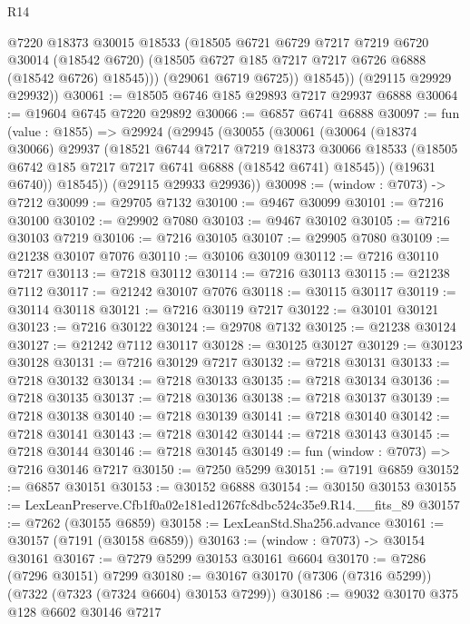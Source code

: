\begin{lexlean}{R14}
\begin{coremodule}
              @7220
              @18373
              @30015
              @18533
              (@18505
                @6721
                @6729
                @7217
                @7219
                @6720
                @30014
                (@18542 @6720)
                (@18505 @6727 @185 @7217 @7217 @6726 @6888 (@18542 @6726) @18545)))
            (@29061 @6719 @6725))
          @18545))
      (@29115 @29929 @29932))
@30061 := @18505 @6746 @185 @29893 @7217 @29937 @6888
@30064 := @19604 @6745 @7220 @29892
@30066 := @6857 @6741 @6888
@30097 := fun (value : @1855) =>
  @29924
    (@29945
      (@30055
        (@30061
          (@30064
            (@18374 @30066)
            @29937
            (@18521
              @6744
              @7217
              @7219
              @18373
              @30066
              @18533
              (@18505 @6742 @185 @7217 @7217 @6741 @6888 (@18542 @6741) @18545))
            (@19631 @6740))
          @18545))
      (@29115 @29933 @29936))
@30098 := (window : @7073) -> @7212
@30099 := @29705 @7132
@30100 := @9467 @30099
@30101 := @7216 @30100
@30102 := @29902 @7080
@30103 := @9467 @30102
@30105 := @7216 @30103 @7219
@30106 := @7216 @30105
@30107 := @29905 @7080
@30109 := @21238 @30107 @7076
@30110 := @30106 @30109
@30112 := @7216 @30110 @7217
@30113 := @7218 @30112
@30114 := @7216 @30113
@30115 := @21238 @7112
@30117 := @21242 @30107 @7076
@30118 := @30115 @30117
@30119 := @30114 @30118
@30121 := @7216 @30119 @7217
@30122 := @30101 @30121
@30123 := @7216 @30122
@30124 := @29708 @7132
@30125 := @21238 @30124
@30127 := @21242 @7112 @30117
@30128 := @30125 @30127
@30129 := @30123 @30128
@30131 := @7216 @30129 @7217
@30132 := @7218 @30131
@30133 := @7218 @30132
@30134 := @7218 @30133
@30135 := @7218 @30134
@30136 := @7218 @30135
@30137 := @7218 @30136
@30138 := @7218 @30137
@30139 := @7218 @30138
@30140 := @7218 @30139
@30141 := @7218 @30140
@30142 := @7218 @30141
@30143 := @7218 @30142
@30144 := @7218 @30143
@30145 := @7218 @30144
@30146 := @7218 @30145
@30149 := fun (window : @7073) => @7216 @30146 @7217
@30150 := @7250 @5299
@30151 := @7191 @6859
@30152 := @6857 @30151
@30153 := @30152 @6888
@30154 := @30150 @30153
@30155 := LexLeanPreserve.Cfb1f0a02e181ed1267fc8dbc524c35e9.R14.__fits_89
@30157 := @7262 (@30155 @6859)
@30158 := LexLeanStd.Sha256.advance
@30161 := @30157 (@7191 (@30158 @6859))
@30163 := (window : @7073) -> @30154 @30161
@30167 := @7279 @5299 @30153 @30161 @6604
@30170 := @7286 (@7296 @30151) @7299
@30180 := @30167 @30170 (@7306 (@7316 @5299)) (@7322 (@7323 (@7324 @6604) @30153 @7299))
@30186 := @9032 @30170 @375 @128 @6602 @30146 @7217

\end{coremodule}
\end{lexlean}
